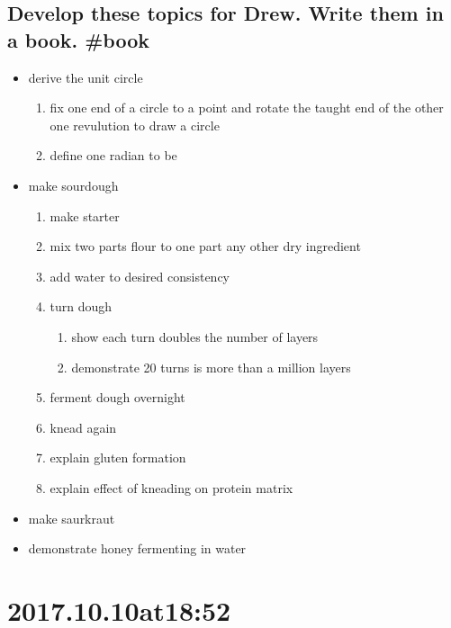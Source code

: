 \begin{enumerate}
\begin{enumerate}
\subsection*{ Develop these topics for Drew. Write them in a book. #book}
\begin{itemize}
    \item derive the unit circle \begin{enumerate}
        \item fix one end of a circle to a point and rotate the taught end of the other one revulution to draw a circle
        \item define one radian to be 
    \end{enumerate}
    \item make sourdough
    \begin{enumerate}
        \item make starter
        \item mix two parts flour to one part any other dry ingredient
        \item add water to desired consistency
        \item turn dough
        \begin{enumerate}
            \item show each turn doubles the number of layers
            \item demonstrate 20 turns is more than a million layers
        \end{enumerate}
        \item ferment dough overnight
        \item knead again
        \item explain gluten formation
        \item explain effect of kneading on protein matrix
    \end{enumerate}
    \item make saurkraut
    \item demonstrate honey fermenting in water
\end{itemize}

\section*{ 2017.10.10at18:52 }

\end{enumerate}
\end{enumerate}

